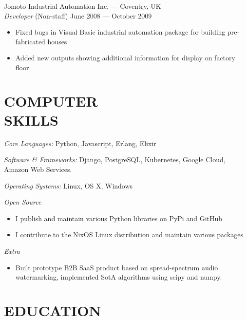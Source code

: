 \documentclass[margin, 10pt]{res}
\begin{document}
\begin{resume}
Jomoto Industrial Automation Inc. --- Coventry, UK \\
{\sl Developer} \hfill (Non-staff) June 2008 --- October 2009 \\
\begin{itemize} \itemsep -1pt
\item Fixed bugs in Visual Basic industrial automation package for building pre-fabricated houses
\item Added new outputs showing additional information for display on factory floor
\end{itemize}


\section{COMPUTER \\ SKILLS}

{\sl Core Languages:}
Python, Javascript, Erlang, Elixir

{\sl Software \& Frameworks:}
Django, PostgreSQL, Kubernetes, Google Cloud, Amazon Web Services.

{\sl Operating Systems:} Linux, OS X, Windows

{\sl Open Source}
\begin{itemize}
\item I publish and maintain various Python libraries on PyPi and GitHub
\item I contribute to the NixOS Linux distribution and maintain various packages
\end{itemize}

{\sl Extra}
\begin{itemize}
\item Built prototype B2B SaaS product based on spread-spectrum audio watermarking, implemented SotA algorithms using scipy and numpy.
\end{itemize}


\section{EDUCATION}


\end{resume}
\end{document}
